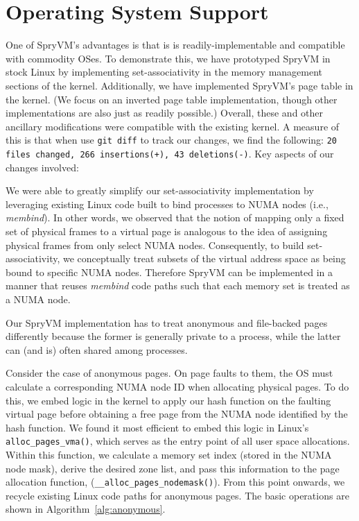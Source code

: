 \section{Operating System Support}
\label{sec:os}

One of SpryVM's advantages is that is is readily-implementable and
compatible with commodity OSes. To demonstrate this, we have
prototyped SpryVM in stock Linux by implementing set-associativity in
the memory management sections of the kernel. Additionally, we have
implemented SpryVM's page table in the kernel. (We focus on an
inverted page table implementation, though other implementations are
also just as readily possible.) Overall, these and other ancillary
modifications were compatible with the existing kernel. A measure of
this is that when use \verb|git diff| to track our changes, we find
the following: \texttt{20 files changed, 266 insertions(+), 43
  deletions(-)}. Key aspects of our changes involved:

\vspace{2mm}
 We were
able to greatly simplify our set-associativity implementation by
leveraging existing Linux code built to bind processes to NUMA nodes
(i.e., {\it membind}). In other words, we observed that the notion of
mapping only a fixed set of physical frames to a virtual page is
analogous to the idea of assigning physical frames from only select
NUMA nodes. Consequently, to build set-associativity, we conceptually
treat subsets of the virtual address space as being bound to specific
NUMA nodes. Therefore SpryVM can be implemented in a manner that
reuses {\it membind} code paths such that each memory set is treated
as a NUMA node. 

\vspace{2mm}
 Our SpryVM
implementation has to treat anonymous and file-backed pages
differently because the former is generally private to a process,
while the latter can (and is) often shared among processes.

Consider the case of anonymous pages. On page faults to them, the OS
must calculate a corresponding NUMA node ID when allocating physical
pages. To do this, we embed logic in the kernel to apply our hash
function on the faulting virtual page before obtaining a free page
from the NUMA node identified by the hash function. We found it most
efficient to embed this logic in Linux's \verb|alloc_pages_vma()|,
which serves as the entry point of all user space allocations. Within
this function, we calculate a memory set index (stored in the NUMA
node mask), derive the desired zone list, and pass this information to
the page allocation function, (\verb|__alloc_pages_nodemask()|). From
this point onwards, we recycle existing Linux code paths for anonymous
pages. The basic operations are shown in
Algorithm~\ref{alg:anonymous}.

